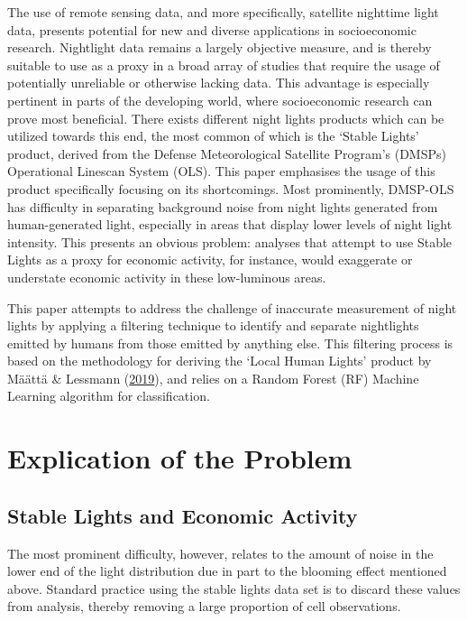 \documentclass[11pt,preprint, authoryear]{elsarticle}
\numberwithin{equation}{section}
\numberwithin{figure}{section}
\numberwithin{table}{section}
\begin{document}
The use of remote sensing data, and more specifically, satellite
nighttime light data, presents potential for new and diverse
applications in socioeconomic research. Nightlight data remains a
largely objective measure, and is thereby suitable to use as a proxy in
a broad array of studies that require the usage of potentially
unreliable or otherwise lacking data. This advantage is especially
pertinent in parts of the developing world, where socioeconomic research
can prove most beneficial. There exists different night lights products
which can be utilized towards this end, the most common of which is the
`Stable Lights' product, derived from the Defense Meteorological
Satellite Program's (DMSPs) Operational Linescan System (OLS). This
paper emphasises the usage of this product specifically focusing on its
shortcomings. Most prominently, DMSP-OLS has difficulty in separating
background noise from night lights generated from human-generated light,
especially in areas that display lower levels of night light intensity.
This presents an obvious problem: analyses that attempt to use Stable
Lights as a proxy for economic activity, for instance, would exaggerate
or understate economic activity in these low-luminous areas.

This paper attempts to address the challenge of inaccurate measurement
of night lights by applying a filtering technique to identify and
separate nightlights emitted by humans from those emitted by anything
else. This filtering process is based on the methodology for deriving
the `Local Human Lights' product by Määttä \& Lessmann
(\protect\hyperlink{ref-maatta}{2019}), and relies on a Random Forest
(RF) Machine Learning algorithm for classification.

\hypertarget{explication-of-the-problem}{%
\section{Explication of the Problem}\label{explication-of-the-problem}}

\hypertarget{stable-lights-and-economic-activity}{%
\subsection{Stable Lights and Economic
Activity}\label{stable-lights-and-economic-activity}}

The most prominent difficulty, however, relates to the amount of noise
in the lower end of the light distribution due in part to the blooming
effect mentioned above. Standard practice using the stable lights data
set is to discard these values from analysis, thereby removing a large
proportion of cell observations.
\end{document}
